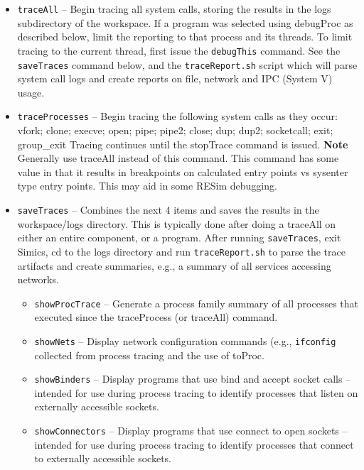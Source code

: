 \documentclass[titlepage]{article}
\begin{document}
\begin{itemize}
\item {\tt traceAll} – Begin tracing all system calls, storing the results in the logs subdirectory of the workspace.  
If a program was selected using debugProc as described below, limit the reporting to that process and its threads.  
To limit tracing to the current thread, first issue the {\tt debugThis} command.
See the {\tt saveTraces} command below, and the {\tt traceReport.sh} script which will parse system call logs and create reports on file, network and IPC (System V) usage.
\item {\tt traceProcesses} – Begin tracing the following system calls as they occur:
vfork; clone; execve;  open; pipe; pipe2; close; dup; dup2; socketcall; exit; group\_exit
Tracing continues until the stopTrace command is issued.  
\textbf{Note} Generally use traceAll instead of this command.  This command has some value in that it results in breakpoints on calculated entry points vs
sysenter type entry points.  This may aid in some RESim debugging.

\item {\tt saveTraces} -- Combines the next 4 items and saves the results in the workspace/logs directory.  This is typically done after doing a traceAll
on either an entire component, or a program.  After running {\tt saveTraces}, exit Simics, cd to the logs directory and run {\tt traceReport.sh} to parse
the trace artifacts and create summaries, e.g., a summary of all services accessing networks.
\begin{itemize}
\item {\tt showProcTrace} – Generate a process family summary of all processes that executed since the traceProcess (or traceAll) command.

\item {\tt showNets} – Display network configuration commands (e.g., {\tt ifconfig} collected from process tracing and the use of toProc.

\item {\tt showBinders} – Display programs that use bind and accept socket calls – intended for use during process tracing to identify processes that listen on externally accessible sockets.

\item {\tt showConnectors} – Display programs that use connect to open sockets – intended for use during process tracing to identify processes that connect to externally accessible sockets.
\end{itemize}


\end{itemize}
\end{document}
